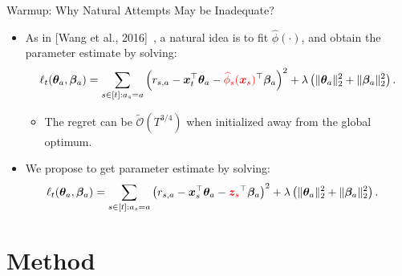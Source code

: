 \documentclass[10pt, xcolor={dvipsnames,x11names},compress]{beamer}
\begin{document}
\begin{frame}[label=warmup]{Warmup: Why Natural Attempts May be Inadequate?}
\begin{itemize}
    \item As in [Wang et al., 2016]~, a natural idea is to fit $\widehat{\phi}(\cdot)$, and obtain the parameter estimate by solving:
    {\small
    \begin{align}
    \ell_t ({\bm{\theta}}_a, {\bm{\beta}}_a) = \sum_{s\in [t]: a_s = a}  \left(r_{s, a} - {\bm{x}}_t^\top {\bm{\theta}}_{a} - \textcolor{red}{\widehat{\phi}_{s}({\bm{x}}_s)}^\top {\bm{\beta}}_{a}\right)^2+\lambda \left( \|{\bm{\theta}}_a\|_2^2 +  \|{\bm{\beta}}_a\|_2^2 \right). \nonumber
    \end{align}
    }
    \begin{itemize}
        \item The regret can be $\widetilde{\mathcal{O}}({T^{3/4}})$ when initialized away from the global optimum.
    \end{itemize}
    \vspace{+6pt}
    \item We propose to get parameter estimate by solving:
    {\small
    \begin{align}\label{eqn:w-closed-form}
    \ell_t ({\bm{\theta}}_a, {\bm{\beta}}_a) &= \sum_{s\in[t]: a_s = a}  \left(r_{s, a} - {\bm{x}}_s^\top {\bm{\theta}}_{a} - {\color{red}{{\bm{z}}_s}}^{\top} {\bm{\beta}}_{a}\right)^2+\lambda \left(\|{\bm{\theta}}_a\|_2^2 + \|{\bm{\beta}}_{a}\|_{2}^{2}\right). \nonumber
    \end{align}
    }  
\end{itemize}


\end{frame}

\section{Method}
\end{document}
